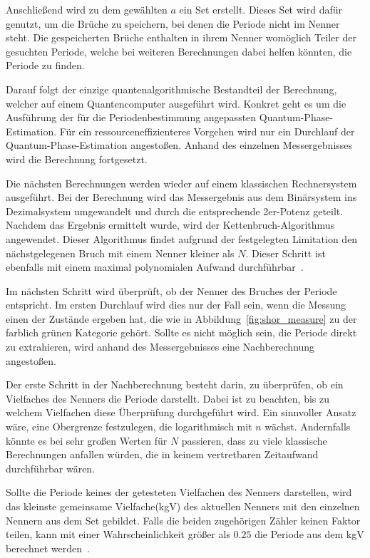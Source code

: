 Anschließend wird zu dem gewählten \(a\) ein Set erstellt.
Dieses Set wird dafür genutzt, um die Brüche zu speichern, 
bei denen die Periode nicht im Nenner steht. 
Die gespeicherten Brüche enthalten in ihrem Nenner womöglich Teiler der gesuchten Periode, 
welche bei weiteren Berechnungen dabei helfen könnten, die Periode zu finden.

Darauf folgt der einzige quantenalgorithmische Bestandteil der Berechnung, 
welcher auf einem Quantencomputer ausgeführt wird.
Konkret geht es um die Ausführung der für die Periodenbestimmung angepassten Quantum-Phase-Estimation. 
Für ein ressourceneffizienteres Vorgehen wird nur ein Durchlauf der Quantum-Phase-Estimation angestoßen.
Anhand des einzelnen Messergebnisses wird die Berechnung fortgesetzt.

Die nächsten Berechnungen werden wieder auf einem klassischen Rechnersystem ausgeführt.
Bei der Berechnung wird das Messergebnis aus dem Binärsystem ins Dezimalsystem umgewandelt
und durch die entsprechende 2er-Potenz geteilt.
Nachdem das Ergebnis ermittelt wurde, 
wird der Kettenbruch-Algorithmus angewendet. 
Dieser Algorithmus findet aufgrund der festgelegten Limitation den nächstgelegenen Bruch mit einem Nenner kleiner als \(N\).
Dieser Schritt ist ebenfalls mit einem maximal polynomialen Aufwand durchführbar~\autocite[230]{nielsen_chuang_2010}.

Im nächsten Schritt wird überprüft, ob der Nenner des Bruches der Periode entspricht.
Im ersten Durchlauf wird dies nur der Fall sein, 
wenn die Messung einen der Zustände ergeben hat, 
die wie in Abbildung~\ref{fig:shor_measure} zu der farblich grünen Kategorie gehört.
Sollte es nicht möglich sein, die Periode direkt zu extrahieren, 
wird anhand des Messergebnisses eine Nachberechnung angestoßen.

Der erste Schritt in der Nachberechnung besteht darin, 
zu überprüfen, ob ein Vielfaches des Nenners die Periode darstellt.
Dabei ist zu beachten, bis zu welchem Vielfachen diese Überprüfung durchgeführt wird. 
Ein sinnvoller Ansatz wäre, eine Obergrenze festzulegen, die logarithmisch mit \(n\) wächst.
Andernfalls könnte es bei sehr großen Werten für \(N\) passieren, 
dass zu viele klassische Berechnungen anfallen würden, die in keinem vertretbaren Zeitaufwand durchführbar wären.

Sollte die Periode keines der getesteten Vielfachen des Nenners darstellen, 
wird das kleinste gemeinsame Vielfache(kgV) des aktuellen Nenners mit den einzelnen Nennern aus dem Set gebildet.
Falls die beiden zugehörigen Zähler keinen Faktor teilen, 
kann mit einer Wahrscheinlichkeit größer als \(0.25\) die Periode aus dem kgV berechnet werden~\cite[231]{nielsen_chuang_2010}.

